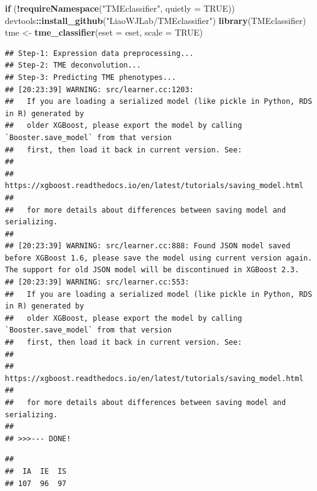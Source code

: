 \documentclass[
  12pt,
]{book}
\newenvironment{Shaded}{\begin{snugshade}}{\end{snugshade}}
\newcommand{\AttributeTok}[1]{\textcolor[rgb]{0.13,0.29,0.53}{#1}}
\newcommand{\ConstantTok}[1]{\textcolor[rgb]{0.56,0.35,0.01}{#1}}
\newcommand{\ControlFlowTok}[1]{\textcolor[rgb]{0.13,0.29,0.53}{\textbf{#1}}}
\newcommand{\FunctionTok}[1]{\textcolor[rgb]{0.13,0.29,0.53}{\textbf{#1}}}
\newcommand{\NormalTok}[1]{#1}
\newcommand{\OtherTok}[1]{\textcolor[rgb]{0.56,0.35,0.01}{#1}}
\newcommand{\SpecialCharTok}[1]{\textcolor[rgb]{0.81,0.36,0.00}{\textbf{#1}}}
\newcommand{\StringTok}[1]{\textcolor[rgb]{0.31,0.60,0.02}{#1}}
\begin{document}
\begin{Shaded}
\begin{Highlighting}[]
\ControlFlowTok{if}\NormalTok{ (}\SpecialCharTok{!}\FunctionTok{requireNamespace}\NormalTok{(}\StringTok{"TMEclassifier"}\NormalTok{, }\AttributeTok{quietly =} \ConstantTok{TRUE}\NormalTok{)) devtools}\SpecialCharTok{::}\FunctionTok{install\_github}\NormalTok{(}\StringTok{"LiaoWJLab/TMEclassifier"}\NormalTok{)}
\FunctionTok{library}\NormalTok{(TMEclassifier)}
\NormalTok{tme }\OtherTok{\textless{}{-}} \FunctionTok{tme\_classifier}\NormalTok{(}\AttributeTok{eset =}\NormalTok{ eset, }\AttributeTok{scale =} \ConstantTok{TRUE}\NormalTok{)}
\end{Highlighting}
\end{Shaded}

\begin{verbatim}
## Step-1: Expression data preprocessing...
## Step-2: TME deconvolution...
## Step-3: Predicting TME phenotypes...
## [20:23:39] WARNING: src/learner.cc:1203: 
##   If you are loading a serialized model (like pickle in Python, RDS in R) generated by
##   older XGBoost, please export the model by calling `Booster.save_model` from that version
##   first, then load it back in current version. See:
## 
##     https://xgboost.readthedocs.io/en/latest/tutorials/saving_model.html
## 
##   for more details about differences between saving model and serializing.
## 
## [20:23:39] WARNING: src/learner.cc:888: Found JSON model saved before XGBoost 1.6, please save the model using current version again. The support for old JSON model will be discontinued in XGBoost 2.3.
## [20:23:39] WARNING: src/learner.cc:553: 
##   If you are loading a serialized model (like pickle in Python, RDS in R) generated by
##   older XGBoost, please export the model by calling `Booster.save_model` from that version
##   first, then load it back in current version. See:
## 
##     https://xgboost.readthedocs.io/en/latest/tutorials/saving_model.html
## 
##   for more details about differences between saving model and serializing.
## 
## >>>--- DONE!
\end{verbatim}

\begin{Shaded}
\end{Shaded}

\begin{verbatim}
## 
##  IA  IE  IS 
## 107  96  97
\end{verbatim}
\end{document}

